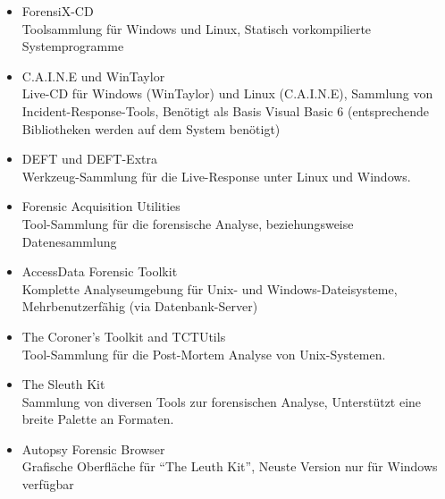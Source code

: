 \begin{itemize}
\item ForensiX-CD\\
Toolsammlung für Windows und Linux, Statisch vorkompilierte Systemprogramme

\item C.A.I.N.E und WinTaylor \\
Live-CD für Windows (WinTaylor) und Linux (C.A.I.N.E), Sammlung von Incident-Response-Tools, Benötigt als Basis Visual Basic 6 (entsprechende Bibliotheken werden auf dem System benötigt)

\item DEFT und DEFT-Extra\\
Werkzeug-Sammlung für die Live-Response unter Linux und Windows.

\item Forensic Acquisition Utilities \\
Tool-Sammlung für die forensische Analyse, beziehungsweise Datenesammlung

\item AccessData Forensic Toolkit \\
Komplette Analyseumgebung für Unix- und Windows-Dateisysteme, Mehrbenutzerfähig (via Datenbank-Server)

\item The Coroner's Toolkit and TCTUtils\\
Tool-Sammlung für die Post-Mortem Analyse von Unix-Systemen.

\item The Sleuth Kit\\
Sammlung von diversen Tools zur forensischen Analyse, Unterstützt eine breite Palette an Formaten.

\item Autopsy Forensic Browser\\
Grafische Oberfläche für "`The Leuth Kit"', Neuste Version nur für Windows verfügbar

\end{itemize}




